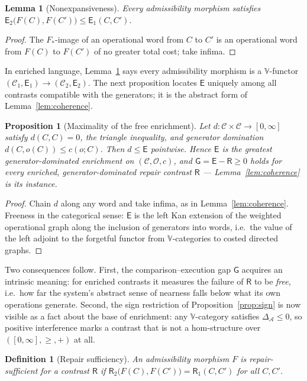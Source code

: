 \documentclass[11pt]{article}
\newtheorem{proposition}[theorem]{Proposition}
\newtheorem{lemma}[theorem]{Lemma}
\newtheorem{definition}[theorem]{Definition}
\theoremstyle{remark}
\newcommand{\C}{\mathcal{C}}
\newcommand{\Ops}{\mathcal{O}}
\newcommand{\A}{\mathcal{A}}
\newcommand{\R}{\mathsf{R}}
\newcommand{\E}{\mathsf{E}}
\newcommand{\G}{\mathsf{G}}
\begin{document}
\begin{lemma}[Nonexpansiveness]\label{lem:nonexp}
Every admissibility morphism satisfies
$\E_2\bigl(F(C),F(C')\bigr) \le \E_1(C,C')$.
\end{lemma}

\begin{proof}
The $F_{*}$-image of an operational word from $C$ to $C'$ is an
operational word from $F(C)$ to $F(C')$ of no greater total cost;
take infima.
\end{proof}

In enriched language, Lemma~\ref{lem:nonexp} says every admissibility
morphism is a $\mathbb{V}$-functor $(\C_1,\E_1)\to(\C_2,\E_2)$. The
next proposition locates $\E$ uniquely among all contrasts compatible
with the generators; it is the abstract form of
Lemma~\ref{lem:coherence}.

\begin{proposition}[Maximality of the free enrichment]
\label{prop:maximal}
Let $d\colon \C\times\C \to [0,\infty]$ satisfy $d(C,C)=0$, the
triangle inequality, and generator domination
$d(C,o(C)) \le c(o;C)$. Then $d \le \E$ pointwise. Hence $\E$ is the
greatest generator-dominated enrichment on $(\C,\Ops,c)$, and
$\G = \E - \R \ge 0$ holds for \emph{every} enriched, generator-dominated
repair contrast $\R$ --- Lemma~\ref{lem:coherence} is its instance.
\end{proposition}

\begin{proof}
Chain $d$ along any word and take infima, as in
Lemma~\ref{lem:coherence}. Freeness in the categorical sense: $\E$ is
the left Kan extension of the weighted operational graph along the
inclusion of generators into words, i.e.\ the value of the left
adjoint to the forgetful functor from $\mathbb{V}$-categories to
costed directed graphs.
\end{proof}

Two consequences follow. First, the comparison--execution
gap $\G$ acquires an intrinsic meaning: for enriched contrasts it
measures the failure of $\R$ to be \emph{free}, i.e.\ how far the
system's abstract sense of nearness falls below what its own
operations generate. Second, the sign restriction of
Proposition~\ref{prop:sign} is now visible as a fact about the base of
enrichment: any $\mathbb{V}$-category satisfies $\Delta_{\A}\le 0$,
so positive interference marks a contrast that is not a hom-structure
over $([0,\infty],\ge,+)$ at all.

\begin{definition}[Repair sufficiency]\label{def:sufficient}
An admissibility morphism $F$ is \emph{repair-sufficient} for a
contrast $\R$ if $\R_2\bigl(F(C),F(C')\bigr) = \R_1(C,C')$ for all
$C,C'$.
\end{definition}
\end{document}

